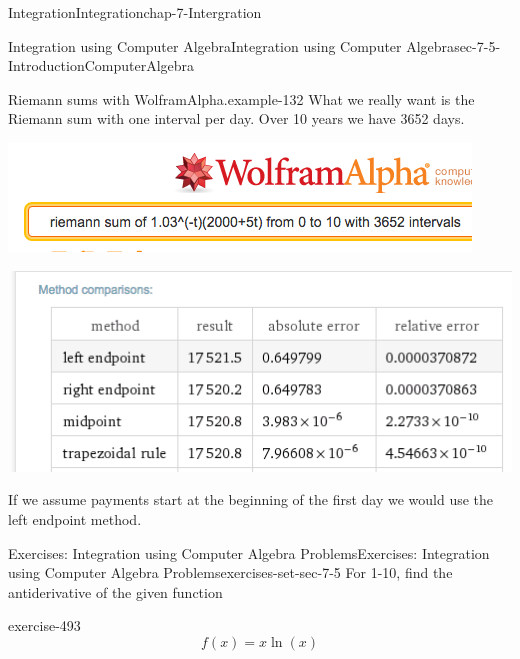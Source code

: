 \documentclass[oneside,10pt,]{book}
\numberwithin{equation}{section}
\begin{document}
\begin{chapterptx}{Integration}{}{Integration}{}{}{chap-7-Intergration}
\begin{sectionptx}{Integration using Computer Algebra}{}{Integration using Computer Algebra}{}{}{sec-7-5-IntroductionComputerAlgebra}
\begin{example}{Riemann sums with Wolfram\textbar{}Alpha.}{example-132}
\hypertarget{p-2915}{}%
What we really want is the Riemann sum with one interval per day.  Over 10 years we have 3652 days.%
\begin{sidebyside}{1}{0.15}{0.15}{0}%
\begin{sbspanel}{0.7}%
\includegraphics[width=1\linewidth]{images/sec7-5-23.png}
\end{sbspanel}%
\end{sidebyside}%
\begin{sidebyside}{1}{0.15}{0.15}{0}%
\begin{sbspanel}{0.7}%
\includegraphics[width=1\linewidth]{images/sec7-5-24.png}
\end{sbspanel}%
\end{sidebyside}%
\par
\hypertarget{p-2916}{}%
If we assume payments start at the beginning of the first day we would use the left endpoint method.%
\end{example}
%
%
\typeout{************************************************}
\typeout{************************************************}
%
\begin{exercises-subsection-numberless}{Exercises: Integration using Computer Algebra Problems}{}{Exercises: Integration using Computer Algebra Problems}{}{}{exercises-set-sec-7-5}
\hypertarget{p-2917}{}%
For 1-10, find the antiderivative of the given function%
\begin{divisionexercise}{1}{}{}{exercise-493}%
%
\begin{equation*}
f(x)=x \ln(x)
\end{equation*}
\par\smallskip%

\end{divisionexercise}
\end{exercises-subsection-numberless}
\end{sectionptx}
\end{chapterptx}
\end{document}
